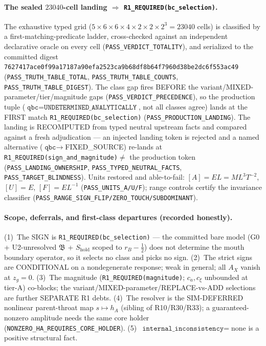 \paragraph{The sealed \(23040\)-cell landing \(\Rightarrow\) \texttt{R1\_REQUIRED(bc\_selection)}.}
The exhaustive typed grid (\(5\times6\times6\times4\times2\times2\times2^3=23040\)
cells) is classified by a first-matching-predicate ladder, cross-checked against an
independent declarative oracle on every cell (\texttt{PASS\_VERDICT\_TOTALITY}), and
serialized to the committed digest
\texttt{7627417ace0f99a17187a90efa2523ca9b68df8b64f7960d38be2dc6f553ac49}
(\texttt{PASS\_TRUTH\_TABLE\_TOTAL}, \texttt{PASS\_TRUTH\_TABLE\_COUNTS},
\texttt{PASS\_TRUTH\_TABLE\_DIGEST}). The class gap fires BEFORE the
variant/MIXED-parameter/tier/magnitude gaps (\texttt{PASS\_VERDICT\_PRECEDENCE}), so
the production tuple (\(\texttt{qbc}=\texttt{UNDETERMINED\_ANALYTICALLY}\), not all
classes agree) lands at the FIRST match \texttt{R1\_REQUIRED(bc\_selection)}
(\texttt{PASS\_PRODUCTION\_LANDING}). The landing is RECOMPUTED from typed neutral
upstream facts and compared against a fresh adjudication --- an injected landing
token is rejected and a named alternative (\(\texttt{qbc}\to\)FIXED\_SOURCE)
re-lands at \texttt{R1\_REQUIRED(sign\_and\_magnitude)}\(\ne\) the production token
(\texttt{PASS\_LANDING\_OWNERSHIP}, \texttt{PASS\_TYPED\_NEUTRAL\_FACTS},
\texttt{PASS\_TARGET\_BLINDNESS}). Units restored and able-to-fail:
\([A]=EL=ML^3T^{-2}\), \([U]=E\), \([F]=EL^{-1}\)
(\texttt{PASS\_UNITS\_A/U/F}); range controls certify the invariance classifier
(\texttt{PASS\_RANGE\_SIGN\_FLIP/ZERO\_TOUCH/SUBDOMINANT}).

\paragraph{Scope, deferrals, and first-class departures (recorded honestly).}
(1)~The SIGN is \texttt{R1\_REQUIRED(bc\_selection)} --- the committed bare model
(G0 + U2-unresolved \(\mathfrak{B}\) + \(S_{\mathrm{hold}}\) scoped to \(r_B-\tfrac12\))
does not determine the mouth boundary operator, so it selects no class and picks no
sign. (2)~The strict signs are CONDITIONAL on a nondegenerate response; weak in
general; all \(A_X\) vanish at \(z_g=0\). (3)~The magnitude
(\texttt{R1\_REQUIRED(magnitude)}; \(c_a,c_\xi\) unbounded at tier-A) co-blocks; the
variant/MIXED-parameter/REPLACE-vs-ADD selections are further SEPARATE R1 debts.
(4)~The resolver is the SIM-DEFERRED nonlinear parent-throat map \(s\mapsto h_A\)
(sibling of R10/R30/R33); a guaranteed-nonzero amplitude needs the same core holder
(\texttt{NONZERO\_HA\_REQUIRES\_CORE\_HOLDER}). (5)~\(\texttt{internal\_inconsistency}=\)none
is a positive structural fact.

